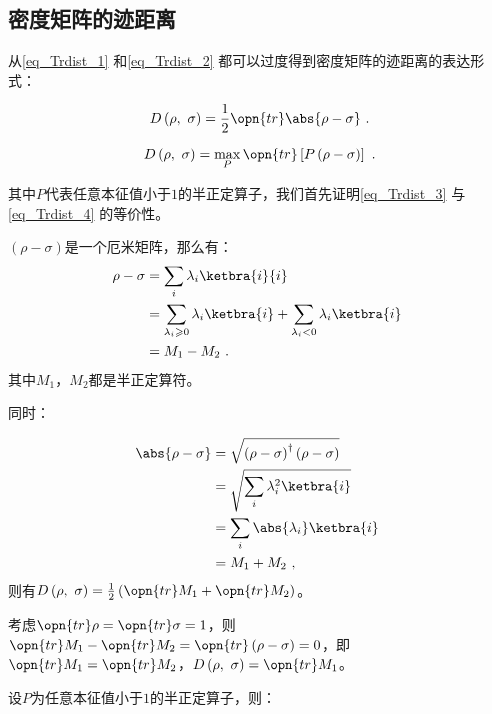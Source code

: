\subsection{密度矩阵的迹距离}

从\autoref{eq_Trdist_1} 和\autoref{eq_Trdist_2} 都可以过度得到密度矩阵的迹距离的表达形式：

\begin{equation}\label{eq_Trdist_4}
D\left(\rho,~\sigma\right) = \frac{1}{2} \opn{tr}\abs{\rho - \sigma}~.
\end{equation}

\begin{equation}\label{eq_Trdist_3}
D\left(\rho,~\sigma\right) = \max_{ P } \opn{tr}\left[P\left(\rho - \sigma\right)\right]~.
\end{equation}

其中$P$代表任意本征值小于$1$的半正定算子，我们首先证明\autoref{eq_Trdist_3} 与\autoref{eq_Trdist_4} 的等价性。

$\left(\rho - \sigma\right)$是一个厄米矩阵，那么有：
\begin{equation}
\begin{aligned}
\rho - \sigma &= \sum_i \lambda_i \ketbra{i}{i} \\
&= \sum_{\lambda_i \geqslant 0}\lambda_i \ketbra{i} + \sum_{\lambda_i<0}\lambda_i\ketbra{i} \\
&= M_1 - M_2~.
\end{aligned}~
\end{equation}
其中$M_1$，$M_2$都是半正定算符。

同时：

\begin{equation}
\begin{aligned}
\abs{\rho - \sigma} &= \sqrt{\left( \rho - \sigma \right)^\dagger \left( \rho - \sigma \right)} \\
&= \sqrt{\sum_i \lambda_i^2\ketbra{i}} \\
&= \sum_i\abs{\lambda_i}\ketbra{i} \\
&= M_1 + M_2~,
\end{aligned}~
\end{equation}
则有$D\left(\rho,~\sigma\right) = \frac{1}{2}\left(\opn{tr}M_1 + \opn{tr}M_2\right)$。

考虑$\opn{tr}\rho = \opn{tr}\sigma = 1$，则$\opn{tr}M_1 - \opn{tr}M_2 = \opn{tr}\left(\rho - \sigma\right) = 0$，即$\opn{tr}M_1 = \opn{tr}M_2$，$D\left(\rho,~\sigma\right) = \opn{tr}M_1$。

设$P$为任意本征值小于$1$的半正定算子，则：

